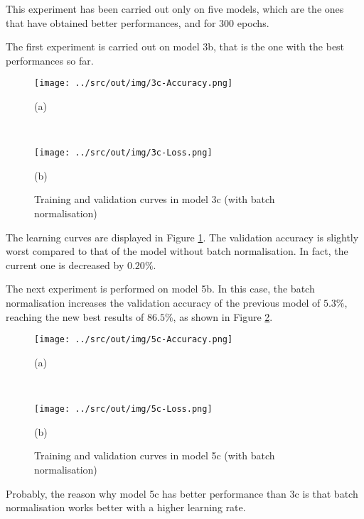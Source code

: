 \documentclass[a4paper,12pt]{article} %
\begin{document}
	This experiment has been carried out only on five models, which are the 
	ones that have obtained better performances, and for 300 epochs.
	\newline
	
	The first experiment is carried out on model 3b, that is the one with the 
	best performances so far. 
	
	\begin{figure}[htb]
		\begin{minipage}[c]{.49\textwidth}
			\centering
			\texttt{[image: ../src/out/img/3c-Accuracy.png]}
			\caption*{(a)}
		\end{minipage}
		~
		\begin{minipage}[c]{.49\textwidth}
			\centering
			\texttt{[image: ../src/out/img/3c-Loss.png]}
			\caption*{(b)}
		\end{minipage}
		\caption{Training and validation curves in model 3c (with batch 
			normalisation)}
		\label{fig:model3c-performance}
	\end{figure}

	The learning curves are displayed in Figure \ref{fig:model3c-performance}. 
	The validation accuracy is slightly worst compared to that of the model 
	without batch normalisation. In fact, the current one is decreased by 
	$0.20\%$.
	\newline
		
	The next experiment is performed on model 5b. In this case, the batch 
	normalisation increases the validation accuracy of the previous model of 
	$5.3\%$, reaching the new best results of $86.5\%$, as shown in Figure 
	\ref{fig:model5c-performance}.

	\begin{figure}[htb]
		\begin{minipage}[c]{.49\textwidth}
			\centering
			\texttt{[image: ../src/out/img/5c-Accuracy.png]}
			\caption*{(a)}
		\end{minipage}
		~
		\begin{minipage}[c]{.49\textwidth}
			\centering
			\texttt{[image: ../src/out/img/5c-Loss.png]}
			\caption*{(b)}
		\end{minipage}
		\caption{Training and validation curves in model 5c (with batch 
			normalisation)}
		\label{fig:model5c-performance}
	\end{figure}
	
	Probably, the reason why model 5c has better performance than 3c is that 
	batch normalisation works better with a higher learning rate.
	\newline
	
\end{document}
